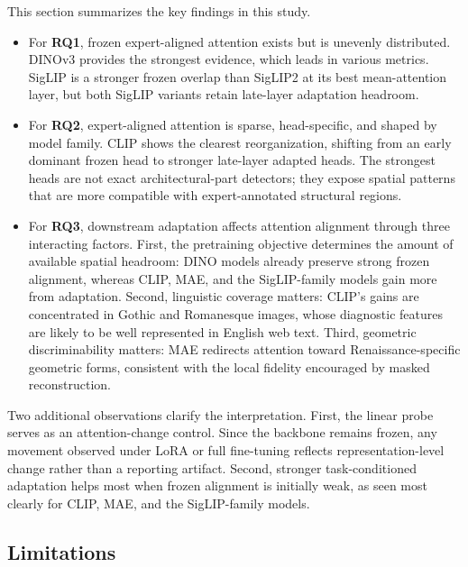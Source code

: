 \documentclass[lineno,pdflatex,sn-mathphys-num]{sn-jnl}%
\theoremstyle{thmstyleone}%
\theoremstyle{thmstyletwo}%
\theoremstyle{thmstylethree}%
\begin{document}
This section summarizes the key findings in this study.
\begin{itemize}
\item For \textbf{RQ1}, frozen expert-aligned attention exists but is unevenly distributed. DINOv3 provides the strongest evidence, which leads in various metrics. SigLIP is a stronger frozen overlap than SigLIP2 at its best mean-attention layer, but both SigLIP variants retain late-layer adaptation headroom.
\item For \textbf{RQ2}, expert-aligned attention is sparse, head-specific, and shaped by model family. CLIP shows the clearest reorganization, shifting from an early dominant frozen head to stronger late-layer adapted heads. The strongest heads are not exact architectural-part detectors; they expose spatial patterns that are more compatible with expert-annotated structural regions.
\item For \textbf{RQ3}, downstream adaptation affects attention alignment through three interacting factors. First, the pretraining objective determines the amount of available spatial headroom: DINO models already preserve strong frozen alignment, whereas CLIP, MAE, and the SigLIP-family models gain more from adaptation. Second, linguistic coverage matters: CLIP's gains are concentrated in Gothic and Romanesque images, whose diagnostic features are likely to be well represented in English web text. Third, geometric discriminability matters: MAE redirects attention toward Renaissance-specific geometric forms, consistent with the local fidelity encouraged by masked reconstruction.
\end{itemize}

Two additional observations clarify the interpretation. First, the linear probe serves as an attention-change control. Since the backbone remains frozen, any movement observed under LoRA or full fine-tuning reflects representation-level change rather than a reporting artifact. Second, stronger task-conditioned adaptation helps most when frozen alignment is initially weak, as seen most clearly for CLIP, MAE, and the SigLIP-family models.

\subsection{Limitations}
\end{document}
